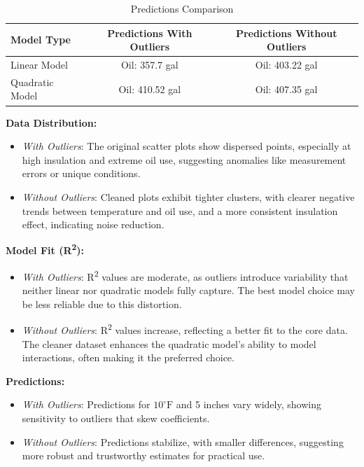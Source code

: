 \documentclass[12pt]{article}
\begin{document}
\begin{table}[h!]
    \centering
    \caption{Predictions Comparison}
    \begin{tabular}{lcc}
        \toprule
        \textbf{Model Type} & \textbf{Predictions With Outliers} & \textbf{Predictions Without Outliers} \\
        \midrule
        Linear Model & Oil: 357.7 gal & Oil: 403.22 gal \\
        Quadratic Model & Oil: 410.52 gal & Oil: 407.35 gal \\
        \bottomrule
    \end{tabular}
\end{table}
\checkmark \textbf{Data Distribution:}
\begin{itemize}
    \item \textit{With Outliers}: The original scatter plots show dispersed points, especially at high insulation and extreme oil use, suggesting anomalies like measurement errors or unique conditions.
    \item \textit{Without Outliers}: Cleaned plots exhibit tighter clusters, with clearer negative trends between temperature and oil use, and a more consistent insulation effect, indicating noise reduction.
\end{itemize}

\checkmark \textbf{Model Fit (R\textsuperscript{2}):}
\begin{itemize}
    \item \textit{With Outliers}: R\textsuperscript{2} values are moderate, as outliers introduce variability that neither linear nor quadratic models fully capture. The best model choice may be less reliable due to this distortion.
    \item \textit{Without Outliers}: R\textsuperscript{2} values increase, reflecting a better fit to the core data. The cleaner dataset enhances the quadratic model's ability to model interactions, often making it the preferred choice.
\end{itemize}

\checkmark \textbf{Predictions:}
\begin{itemize}
    \item \textit{With Outliers}: Predictions for \(10^\circ\text{F}\) and 5 inches vary widely, showing sensitivity to outliers that skew coefficients.
    \item \textit{Without Outliers}: Predictions stabilize, with smaller differences, suggesting more robust and trustworthy estimates for practical use.
\end{itemize}
\end{document}
